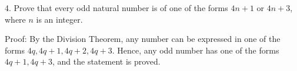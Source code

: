 \documentclass[12pt]{article}
\begin{document}
4. Prove that every odd natural number is of one of the forms $4n+1$ or $4n+3$, where $n$ is an integer.\newline


Proof: By the Division Theorem, any number can be expressed in one of the forms $4q, 4q+1, 4q+2, 4q+3$. Hence, any odd number has one of the forms $4q+1, 4q+3$, and the statement is proved. 
\end{document}
